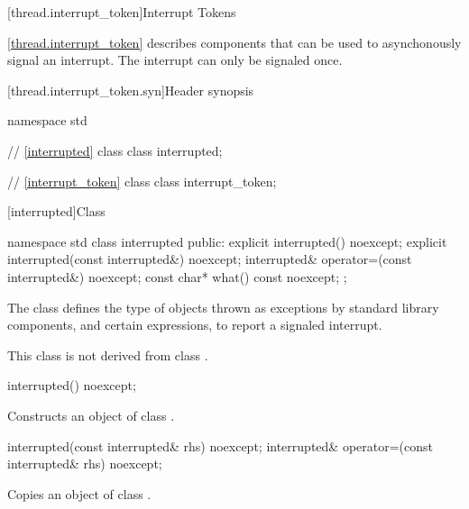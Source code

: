 {\color{insertcolor}

[thread.interrupt_token]{Interrupt Tokens}

\pnum
\ref{thread.interrupt_token} describes components that can be used to
asynchonously signal an interrupt.
The interrupt can only be signaled once.

[thread.interrupt_token.syn]{Header  synopsis}
%

\begin{codeblock}
namespace std {
  // \ref{interrupted} class 
  class interrupted;

  // \ref{interrupt_token} class 
  class interrupt_token;
}
\end{codeblock}

%
[interrupted]{Class }

%
\begin{codeblock}
namespace std {
  class interrupted {
  public:
    explicit interrupted() noexcept;
    explicit interrupted(const interrupted&) noexcept;
    interrupted& operator=(const interrupted&) noexcept;
    const char* what() const noexcept;
  };
}
\end{codeblock}

\pnum
The class
defines the type of objects thrown as
exceptions by \Cpp{} standard library components,
and certain expressions, to report a signaled interrupt.
\begin{note} This class is not derived from class . \end{note}

%
\begin{itemdecl}
interrupted() noexcept;
\end{itemdecl}

\begin{itemdescr}
\pnum
\effects
Constructs an object of class
.
\end{itemdescr}

%
%
\begin{itemdecl}
interrupted(const interrupted& rhs) noexcept;
interrupted& operator=(const interrupted& rhs) noexcept;
\end{itemdecl}
\begin{itemdescr}
  \pnum \effects Copies an object of class .


\end{itemdescr}}
